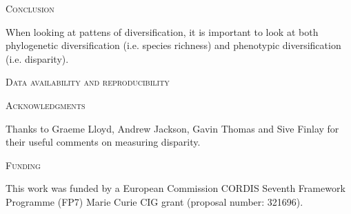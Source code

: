 \documentclass[12pt,letterpaper]{article}
\renewcommand{\section}[1]{%
\bigskip
\begin{center}
\begin{Large}
\normalfont\scshape #1
\medskip
\end{Large}
\end{center}}
\begin{document}


%
%

\section{Conclusion}
When looking at pattens of diversification, it is important to look at both phylogenetic diversification (i.e. species richness) and phenotypic diversification (i.e. disparity).



\section{Data availability and reproducibility}

\section{Acknowledgments}
Thanks to Graeme Lloyd, Andrew Jackson, Gavin Thomas and Sive Finlay for their useful comments on measuring disparity.

\section{Funding} %
This work was funded by a European Commission CORDIS Seventh Framework Programme (FP7) Marie Curie CIG grant (proposal number: 321696).
\end{document}

